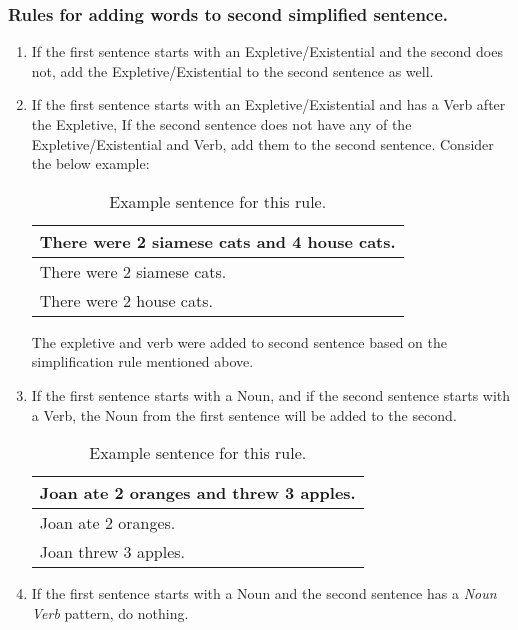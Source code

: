 \documentclass[11pt]{article}
\begin{document}
\subsubsection{Rules for adding words to second simplified sentence.}
\begin{enumerate}
 \item 
If the first sentence starts with an Expletive/Existential and the second does not, add the Expletive/Existential to the second sentence as well.

\item 
If the first sentence starts with an Expletive/Existential and has a Verb after the Expletive, If the second sentence does not have any of the Expletive/Existential and Verb, add them to the second sentence. Consider the below example:

\begin{table}[h!]
\centering
\begin{tabular}{ | m{25em} | }
\hline
 \textbf{There were 2 siamese cats and 4 house cats.}\\
\hline
There were 2 siamese cats.\\
\hline
There were 2 house cats.\\
\hline
\end{tabular}
\caption{Example sentence for this rule.}
\label{table:4}
\end{table}

The expletive and verb were added to second sentence based on the simplification rule mentioned above.

\item
If the first sentence starts with a Noun, and if the second sentence starts with a Verb, the Noun from the first sentence will be added to the second.

\begin{table}[h!]
\centering
\begin{tabular}{ | m{25em} | }
\hline
 \textbf{Joan ate 2 oranges and threw 3 apples.}\\
\hline
Joan ate 2 oranges.\\
\hline
Joan threw 3 apples.\\
\hline
\end{tabular}
\caption{Example sentence for this rule.}
\label{table:5}
\end{table}

\item 
If the first sentence starts with a Noun and the second sentence has a \textit{Noun Verb} pattern, do nothing.


\end{enumerate}
\end{document}
